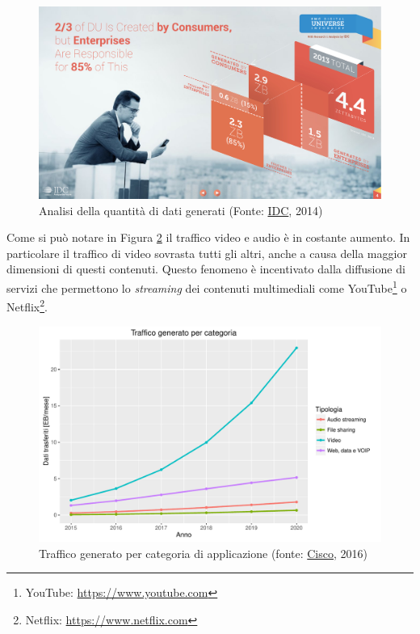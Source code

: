 \begin{figure}[ht]
	\centering
	\includegraphics[width=\textwidth]{1-introduzione/Immagini/dati-generati-consumer.pdf}
	\caption[Analisi della quantità di dati generati]{Analisi della quantità di dati generati (Fonte: \href{http://www.emc.com/leadership/digital-universe/2014iview/executive-summary.htm}{IDC}, 2014)\label{fig:analisi-dati-generati}}
\end{figure}

Come si può notare in Figura \ref{fig:traffico-categoria-applicazione} il traffico video e audio è in costante aumento. In particolare il traffico di video sovrasta tutti gli altri, anche a causa della maggior dimensioni di questi contenuti. Questo fenomeno è incentivato dalla diffusione di servizi che permettono lo \emph{streaming} dei contenuti multimediali come YouTube\footnote{YouTube: \url{https://www.youtube.com}} o Netflix\footnote{Netflix: \url{https://www.netflix.com}}.

\begin{figure}[ht]
	\centering
	\includegraphics[width=\textwidth]{1-introduzione/Immagini/traffico-categoria.pdf}
	\caption[Traffico generato per categoria di applicazione]{Traffico generato per categoria di applicazione (fonte: \href{http://www.cisco.com/c/en/us/solutions/collateral/service-provider/visual-networking-index-vni/mobile-white-paper-c11-520862.html}{Cisco}, 2016)\label{fig:traffico-categoria-applicazione}}
\end{figure}

